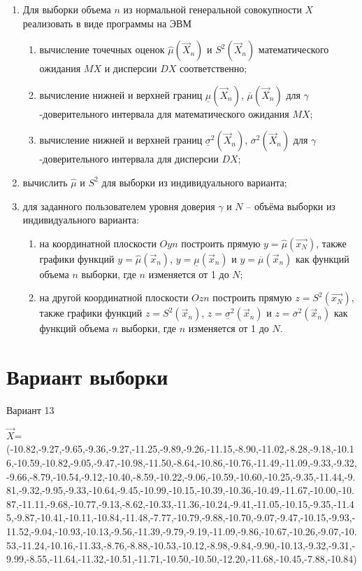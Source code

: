 \documentclass[12pt]{report}
\begin{document}
\begin{enumerate}
	\setlength\itemsep{0.01em}
	\item Для выборки объема $n$ из нормальной генеральной совокупности $X$ реализовать в виде программы на ЭВМ
	\begin{enumerate}
		\setlength\itemsep{0.01em}
		\item вычисление точечных оценок $\hat\mu(\vec X_n)$ и $S^2(\vec X_n)$ математического ожидания $MX$ и дисперсии $DX$ соответственно;
		\item вычисление нижней и верхней границ $\underline\mu(\vec X_n)$, $\overline\mu(\vec X_n)$ для $\gamma$-доверительного интервала для математического ожидания $MX$;
		\item вычисление нижней и верхней границ $\underline\sigma^2(\vec X_n)$, $\overline\sigma^2(\vec X_n)$ для $\gamma$-доверительного интервала для дисперсии $DX$;
	\end{enumerate}
	\item вычислить $\hat\mu$ и $S^2$ для выборки из индивидуального варианта;
	\item для заданного пользователем уровня доверия $\gamma$ и $N$ – объёма выборки из индивидуального варианта:
	\begin{enumerate}
		\setlength\itemsep{0.01em}
		\item на координатной плоскости $Oyn$ построить прямую $y = \hat\mu(\vec{x_N})$, также графики функций $y = \hat\mu(\vec x_n)$, $y = \underline\mu(\vec x_n)$ и $y = \overline\mu(\vec x_n)$ как функций объема $n$ выборки, где $n$ изменяется от 1 до $N$;
		\item на другой координатной плоскости $Ozn$ построить прямую $z = S^2(\vec{x_N})$, также графики функций $z = S^2(\vec x_n)$, $z = \underline\sigma^2(\vec x_n)$ и $z = \overline\sigma^2(\vec x_n)$ как функций объема $n$ выборки, где $n$ изменяется от 1 до $N$.
	\end{enumerate}
\end{enumerate}

\section*{Вариант выборки}
Вариант 13

$\vec{X}$=(-10.82,-9.27,-9.65,-9.36,-9.27,-11.25,-9.89,-9.26,-11.15,-8.90,-11.02,-8.28,-9.18,-10.16,-10.59,-10.82,-9.05,-9.47,-10.98,-11.50,-8.64,-10.86,-10.76,-11.49,-11.09,-9.33,-9.32,-9.66,-8.79,-10.54,-9.12,-10.40,-8.59,-10.22,-9.06,-10.59,-10.60,-10.25,-9.35,-11.44,-9.81,-9.32,-9.95,-9.33,-10.64,-9.45,-10.99,-10.15,-10.39,-10.36,-10.49,-11.67,-10.00,-10.87,-11.11,-9.68,-10.77,-9.13,-8.62,-10.33,-11.36,-10.24,-9.41,-11.05,-10.15,-9.35,-11.45,-9.87,-10.41,-10.11,-10.84,-11.48,-7.77,-10.79,-9.88,-10.70,-9.07,-9.47,-10.15,-9.93,-11.52,-9.04,-10.93,-10.13,-9.56,-11.39,-9.79,-9.19,-11.09,-9.86,-10.67,-10.26,-9.07,-10.53,-11.24,-10.16,-11.33,-8.76,-8.88,-10.53,-10.12,-8.98,-9.84,-9.90,-10.13,-9.32,-9.31,-9.99,-8.55,-11.64,-11.32,-10.51,-11.71,-10.50,-10.50,-12.20,-11.68,-10.45,-7.88,-10.84)
\end{document}
